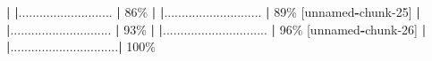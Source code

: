 \documentclass[
]{book}
\newenvironment{Shaded}{\begin{snugshade}}{\end{snugshade}}
\newcommand{\DecValTok}[1]{\textcolor[rgb]{0.00,0.00,0.81}{#1}}
\newcommand{\ErrorTok}[1]{\textcolor[rgb]{0.64,0.00,0.00}{\textbf{#1}}}
\newcommand{\NormalTok}[1]{#1}
\newcommand{\SpecialCharTok}[1]{\textcolor[rgb]{0.81,0.36,0.00}{\textbf{#1}}}
\begin{document}
\begin{Shaded}
\begin{Highlighting}[]
  \SpecialCharTok{|}                                     
  \ErrorTok{|}\NormalTok{...........................    }\SpecialCharTok{|}  \DecValTok{86}\NormalTok{\%                   }
  \SpecialCharTok{|}                                     
  \ErrorTok{|}\NormalTok{............................   }\SpecialCharTok{|}  \DecValTok{89}\NormalTok{\% [unnamed}\SpecialCharTok{{-}}\NormalTok{chunk}\DecValTok{{-}25}\NormalTok{]}
  \SpecialCharTok{|}                                     
  \ErrorTok{|}\NormalTok{.............................  }\SpecialCharTok{|}  \DecValTok{93}\NormalTok{\%                   }
  \SpecialCharTok{|}                                     
  \ErrorTok{|}\NormalTok{.............................. }\SpecialCharTok{|}  \DecValTok{96}\NormalTok{\% [unnamed}\SpecialCharTok{{-}}\NormalTok{chunk}\DecValTok{{-}26}\NormalTok{]}
  \SpecialCharTok{|}                                     
  \ErrorTok{|}\NormalTok{...............................}\SpecialCharTok{|} \DecValTok{100}\NormalTok{\%                   }
\end{Highlighting}
\end{Shaded}
\end{document}
